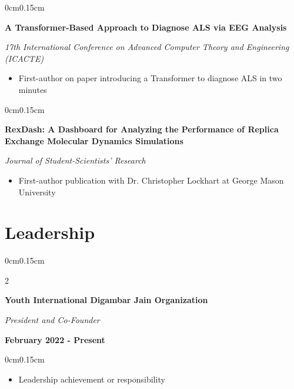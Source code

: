 \documentclass[10pt, letterpaper]{article}
\newenvironment{highlights}{
    \begin{itemize}[topsep=0pt, parsep=0pt, partopsep=0pt, itemsep=0pt, leftmargin=0.6cm]
}{
    \end{itemize}
}
\newenvironment{onecolentry}{
    \begin{adjustwidth}{0cm}{0.15cm}
}{
    \end{adjustwidth}
}
\newenvironment{twocolentry}[2][]{
    \onecolentry
    \def\secondColumn{#2}
    \setcolumnwidth{\fill, 4cm}
    \begin{paracol}{2}
}{
    \switchcolumn \raggedleft \secondColumn
    \end{paracol}
    \endonecolentry
}
\begin{document}
    \vspace{0.05cm}

    \begin{onecolentry}
        \textbf{A Transformer-Based Approach to Diagnose ALS via EEG Analysis}
        
        \textit{17th International Conference on Advanced Computer Theory and Engineering (ICACTE)}
        \begin{highlights}
            \item First-author on paper introducing a Transformer to diagnose ALS in two minutes
        \end{highlights}
    \end{onecolentry}

    \vspace{0.05cm}

    \begin{onecolentry}
        \textbf{RexDash: A Dashboard for Analyzing the Performance of Replica Exchange Molecular Dynamics Simulations}
        
        \textit{Journal of Student-Scientists' Research}
        \begin{highlights}
            \item First-author publication with Dr. Christopher Lockhart at George Mason University
        \end{highlights}
    \end{onecolentry}

    \vspace{0.1cm}

    \section{Leadership}
    \vspace{0.1cm}

    \begin{twocolentry}{\textbf{February 2022 - Present}}
        \textbf{Youth International Digambar Jain Organization}
        
        \textit{President and Co-Founder}
    \end{twocolentry}
    \vspace{-0.15cm}
    \begin{onecolentry}
        \begin{highlights}
            \item Leadership achievement or responsibility
        \end{highlights}
    \end{onecolentry}
\end{document}
